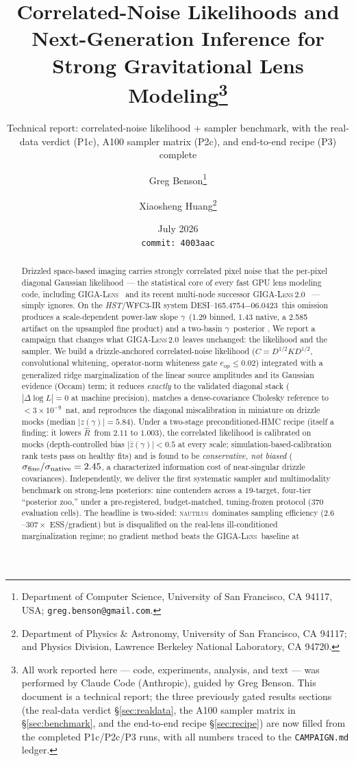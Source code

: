 \documentclass[11pt,letterpaper]{article}
\title{Correlated-Noise Likelihoods and Next-Generation Inference
       for Strong Gravitational Lens Modeling\thanks{All work reported
       here --- code, experiments, analysis, and text --- was performed
       by Claude Code (Anthropic), guided by Greg Benson. This document
       is a technical report; the three previously gated results sections
       (the real-data verdict \S\ref{sec:realdata}, the A100 sampler
       matrix in \S\ref{sec:benchmark}, and the end-to-end recipe
       \S\ref{sec:recipe}) are now filled from the completed P1c/P2c/P3
       runs, with all numbers traced to the \texttt{CAMPAIGN.md} ledger.}}
\author{Greg Benson\thanks{Department of Computer Science, University of
        San Francisco, CA 94117, USA; \texttt{greg.benson@gmail.com}.} \and
        Xiaosheng Huang\thanks{Department of Physics \& Astronomy,
        University of San Francisco, CA 94117; and Physics Division,
        Lawrence Berkeley National Laboratory, CA 94720.}}
\date{July 2026\\[3pt]{\small\texttt{commit:~4003aac}}}
\newcommand{\gammaEPL}{\ensuremath{\gamma}}
\newcommand{\Rhat}{\ensuremath{\hat{R}}}
\newcommand{\eop}{\ensuremath{e_{\mathrm{op}}}}
\newcommand{\foundry}{DESI--165.4754$-$06.0423}
\newcommand{\gigalens}{\textsc{GIGA-Lens}}
\newcommand{\gigalenstwo}{\textsc{GIGA-Lens\,2.0}}
\newcommand{\nautilus}{\textsc{nautilus}}
\begin{document}
\maketitle
\subtitle{Technical report: correlated-noise likelihood + sampler benchmark,
with the real-data verdict (P1c), A100 sampler matrix (P2c), and end-to-end
recipe (P3) complete}

\begin{abstract}
Drizzled space-based imaging carries strongly correlated pixel noise that
the per-pixel diagonal Gaussian likelihood --- the statistical core of every
fast GPU lens modeling code, including \gigalens\ \citep{gu2022gigalens} and
its recent multi-node successor \gigalenstwo\ \citep{huang2026gigalens2} ---
simply ignores. On the {\it HST}/WFC3-IR system \foundry\ this omission
produces a scale-dependent power-law slope \gammaEPL\ (1.29 binned, 1.43
native, a 2.585 artifact on the upsampled fine product) and a two-basin
\gammaEPL\ posterior \citep{huang2025foundry1}. We report a campaign that changes what \gigalenstwo\ leaves
unchanged: the likelihood and the sampler. We build a drizzle-anchored
correlated-noise likelihood ($C=D^{1/2}KD^{1/2}$, convolutional whitening,
operator-norm whiteness gate $\eop\le0.02$) integrated with a generalized
ridge marginalization of the linear source amplitudes and its Gaussian
evidence (Occam) term; it reduces {\it exactly} to the validated diagonal
stack ($|\Delta\log L|=0$ at machine precision), matches a dense-covariance
Cholesky reference to $<3\times10^{-9}$~nat, and reproduces the diagonal
miscalibration in miniature on drizzle mocks (median $|z(\gammaEPL)|=5.84$).
Under a two-stage preconditioned-HMC recipe (itself a finding: it lowers
\Rhat\ from $2.11$ to $1.003$), the correlated likelihood is calibrated on
mocks (depth-controlled bias $|\bar z(\gammaEPL)|<0.5$ at every scale;
simulation-based-calibration rank tests pass on healthy fits) and is found to
be {\it conservative, not biased} ($\sigma_{\rm fine}/\sigma_{\rm
native}=2.45$, a characterized information cost of near-singular drizzle
covariances). Independently, we deliver the first systematic sampler and
multimodality benchmark on strong-lens posteriors: nine contenders across a
$19$-target, four-tier ``posterior zoo,'' under a pre-registered,
budget-matched, tuning-frozen protocol ($370$ evaluation cells). The headline
is two-sided: \nautilus\ dominates sampling efficiency ($2.6$--$307\times$
ESS/gradient) but is disqualified on the real-lens ill-conditioned
marginalization regime; no gradient method beats the \gigalens\ baseline at

\end{abstract}
\end{document}
